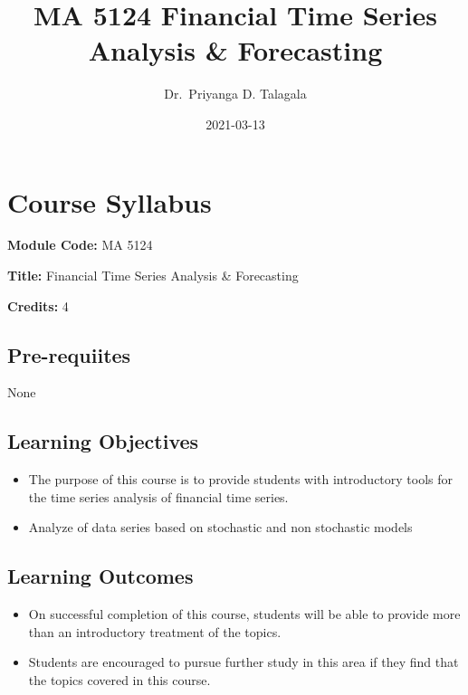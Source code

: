 \documentclass[]{book}
\title{MA 5124 Financial Time Series Analysis \& Forecasting}
\author{Dr.~Priyanga D. Talagala}
\date{2021-03-13}
\providecommand{\tightlist}{%
  \setlength{\itemsep}{0pt}\setlength{\parskip}{0pt}}
\begin{document}
\maketitle

{
\setcounter{tocdepth}{1}
\tableofcontents
}
\hypertarget{course-syllabus}{%
\chapter*{Course Syllabus}\label{course-syllabus}}


\textbf{Module Code:} MA 5124

\textbf{Title:} Financial Time Series Analysis \& Forecasting

\textbf{Credits:} 4

\hypertarget{pre-requiites}{%
\section*{Pre-requiites}\label{pre-requiites}}

None

\hypertarget{learning-objectives}{%
\section*{Learning Objectives}\label{learning-objectives}}

\begin{itemize}
\tightlist
\item
  The purpose of this course is to provide students with introductory tools for the time series analysis of financial time series.
\item
  Analyze of data series based on stochastic and non stochastic models
\end{itemize}

\hypertarget{learning-outcomes}{%
\section*{Learning Outcomes}\label{learning-outcomes}}

\begin{itemize}
\tightlist
\item
  On successful completion of this course, students will be able to provide more than an introductory treatment of the topics.
\item
  Students are encouraged to pursue further study in this area if they find that the topics covered in this course.
\end{itemize}
\end{document}
